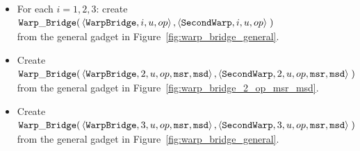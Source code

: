 \begin{itemize}
\begin{itemize}
            \item For each $i = 1,2,3$: create
            $\begin{aligned}[t]
                {\tt Warp\_Bridge}(& \left\langle {\tt WarpBridge}, i, u, op \right\rangle,
                              \left\langle {\tt SecondWarp}, i, u, op \right\rangle \;)
            \end{aligned}$ \\ from the general gadget in Figure~\ref{fig:warp_bridge_general}.
            \vspace{.5cm}

            \item Create
            $\begin{aligned}[t]
                {\tt Warp\_Bridge}(& \left\langle {\tt WarpBridge}, 2, u, op, {\tt msr}, {\tt msd} \right\rangle,
                              \left\langle {\tt SecondWarp}, 2, u, op, {\tt msr}, {\tt msd} \right\rangle \;)
            \end{aligned}$ \\ from the general gadget in Figure~\ref{fig:warp_bridge_2_op_msr_msd}.
            \vspace{.5cm}

            \item Create
            $\begin{aligned}[t]
                {\tt Warp\_Bridge}(& \left\langle {\tt WarpBridge}, 3, u, op, {\tt msr}, {\tt msd} \right\rangle,
                              \left\langle {\tt SecondWarp}, 3, u, op, {\tt msr}, {\tt msd} \right\rangle \;)
            \end{aligned}$ \\ from the general gadget in Figure~\ref{fig:warp_bridge_general}.
            \vspace{.5cm}
        \end{itemize}



\end{itemize}
